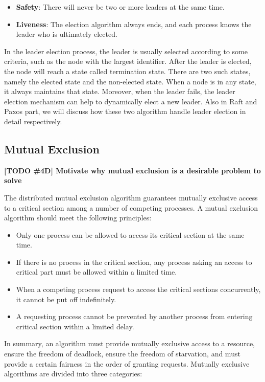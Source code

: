 \documentclass[12pt, a4paper]{article}
\newcommand{\todo}[2]{\textbf{\color{blue}[TODO \##1] #2}\par}
\begin{document}
\begin{itemize}
  \item \textbf{Safety}: There will never be two or more leaders at the same
  time.
  \item \textbf{Liveness}: The election algorithm always ends, and each process
  knows the leader who is ultimately elected.
\end{itemize}

In the leader election process, the leader is usually selected according to some criteria, such as the node with the largest identifier\cite{effatparvar2010improved}. After the leader is elected, the node will reach a state called termination state. There are two such states, namely the elected state and the non-elected state. When a node is in any state, it always maintains that state. Moreover, when the leader fails, the leader election mechanism can help to dynamically elect a new leader. Also in Raft and Paxos part, we will discuss how these two algorithm handle leader election in detail respectively.

\subsection{Mutual Exclusion}
\todo{4D}{Motivate why mutual exclusion is a desirable problem to solve}
The distributed mutual exclusion algorithm guarantees mutually exclusive access to a critical section among a number of competing processes\cite{lamport1987fast}. A mutual exclusion algorithm should meet the following principles\cite{velazques1993survey}:

\begin{itemize}
  \item \textbf{}Only one process can be allowed to access its critical
  section at the same time.
  \item \textbf{}If there is no process in the critical section, any
  process asking an access to critical part must be allowed within a limited
  time.
  \item \textbf{}When a competing process request to access the critical
  sections concurrently, it cannot be put off indefinitely.
  \item \textbf{}A requesting process cannot be prevented by another process
  from entering critical section within a limited delay.
\end{itemize}

In summary, an algorithm must provide mutually exclusive access to a resource, ensure the freedom of deadlock, ensure the freedom of starvation, and must provide a certain fairness in the order of granting requests. Mutually exclusive algorithms are divided into three categories:
\end{document}
